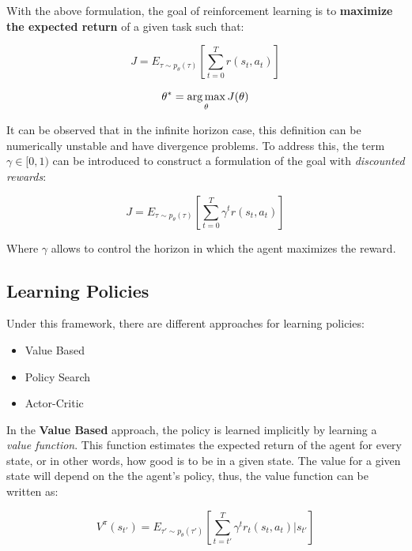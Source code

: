 With the above formulation, the goal of reinforcement learning is to \textbf{maximize the expected return} of a given task such that:

\begin{equation}
    J = E_{\tau \sim p_{\theta}(\tau)} \left[\sum_{t=0}^{T}r(s_{t}, a_{t})\right]
\end{equation}

\begin{equation}
    \theta^{*} = \operatorname*{arg\,max}_{\theta}J(\theta)
\label{eq:objective}
\end{equation}

It can be observed that in the infinite horizon case, this definition can be numerically unstable and have divergence problems. To address this, the term $\gamma \in [0, 1)$ can be introduced to construct a formulation of the goal with \emph{discounted rewards}:

\begin{equation}
    J = E_{\tau \sim p_{\theta}(\tau)} \left[\sum_{t=0}^{T}\gamma^{t}r(s_{t}, a_{t})\right]
\end{equation}

Where $\gamma$ allows to control the horizon in which the agent maximizes the reward.

\newpage

\subsection{Learning Policies}

Under this framework, there are different approaches for learning policies:

\begin{itemize}
    \item Value Based
    \item Policy Search
    \item Actor-Critic
\end{itemize}

In the \textbf{Value Based} approach, the policy is learned implicitly by learning a \emph{value function}. This function estimates the expected return of the agent for every state, or in other words, how good is to be in a given state. The value for a given state will depend on the the agent's policy, thus, the value function can be written as:

\begin{equation}
    V^{\pi}(s_{t'})  = E_{\tau' \sim p_{\theta}(\tau')}\left[\sum_{t=t'}^{T}\gamma^{t}r_{t}(s_{t}, a_{t})|s_{t'}\right]
\end{equation}

